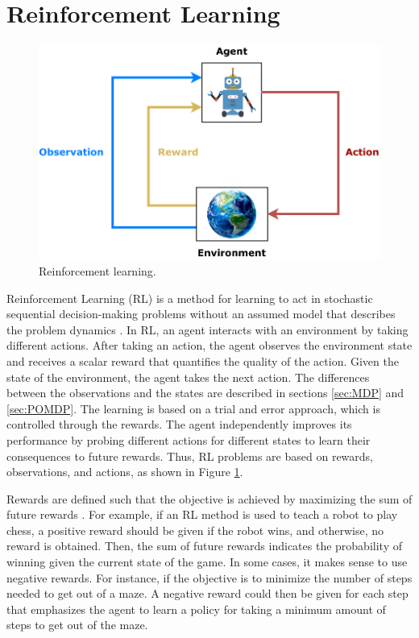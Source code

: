 \documentclass[english, 12pt, a4paper, elec, utf8, a-1b, online]{aaltothesis}
\numberwithin{equation}{section}
\begin{document}
\newpage
\section{Reinforcement Learning} \label{sec:RL}

\begin{figure}[b]
    \centering
    \includegraphics{figures/RL_diagram.pdf}
    \caption{Reinforcement learning.}
    \label{fig:RL_basics}
\end{figure}

Reinforcement Learning (RL) is a method for learning to act in stochastic sequential decision-making problems without an assumed model that describes the problem dynamics \cite{Sutton2018}.
In RL, an agent interacts with an environment by taking different actions.
After taking an action, the agent observes the environment state and receives a scalar reward that quantifies the quality of the action.
Given the state of the environment, the agent takes the next action. 
The differences between the observations and the states are described in sections \ref{sec:MDP} and \ref{sec:POMDP}.
The learning is based on a trial and error approach, which is controlled through the rewards.
The agent independently improves its performance by probing different actions for different states to learn their consequences to future rewards.
Thus, RL problems are based on rewards, observations, and actions, as shown in Figure \ref{fig:RL_basics}.

Rewards are defined such that the objective is achieved by maximizing the sum of future rewards \cite{Sutton2018}.
For example, if an RL method is used to teach a robot to play chess, a positive reward should be given if the robot wins, and otherwise, no reward is obtained.
Then, the sum of future rewards indicates the probability of winning given the current state of the game.
In some cases, it makes sense to use negative rewards.
For instance, if the objective is to minimize the number of steps needed to get out of a maze. 
A negative reward could then be given for each step that emphasizes the agent to learn a policy for taking a minimum amount of steps to get out of the maze.
\end{document}
